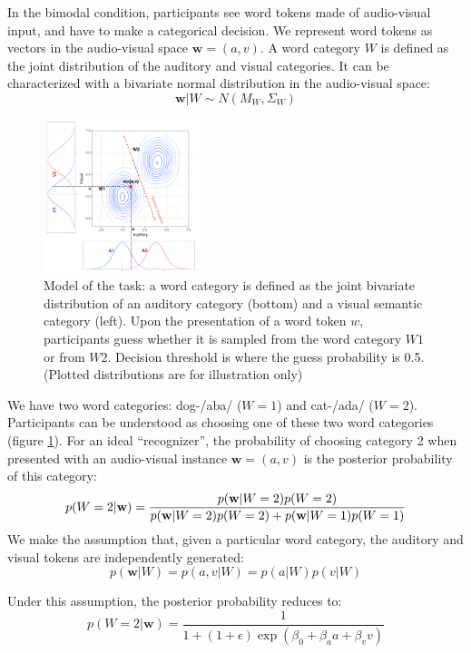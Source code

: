 \documentclass[10pt,letterpaper]{article}
\begin{document}
In the bimodal condition, participants see word tokens made of audio-visual input, and have to make a categorical decision. We represent word tokens as vectors in the audio-visual space $\mathbf{w}=(a,v)$.
A word category $W$ is defined as the joint distribution of the auditory and visual categories. It can be characterized with a bivariate normal distribution in the audio-visual space:
$$ \mathbf{w} | W \sim  N(M_W, \Sigma_W) $$
\begin{figure}[tp]
\centering
\includegraphics[width=0.4\textwidth]{MyTask.png}
\caption{Model of the task: a word category is defined as the joint bivariate distribution of an auditory category (bottom) and a visual semantic category (left). Upon the presentation of a word token $w$, participants guess whether it is sampled from the word category $W1$ or from $W2$. Decision threshold is where the guess probability is 0.5. (Plotted distributions are for illustration only)}
\label{fig:space}
\end{figure}
We have two word categories: dog-/aba/ ($W=1$) and cat-/ada/ ($W=2$). Participants can be understood as choosing one of these two word categories (figure \ref{fig:space}). For an ideal ``recognizer'', the probability of choosing category 2 when presented with an audio-visual instance $\mathbf{w}=(a,v)$ is the posterior probability of this category:
\begin{equation}
\small
p(W=2 | \mathbf{w})=\frac{p(\mathbf{w}|W=2)p(W=2)}{p(\mathbf{w}|W=2)p(W=2)+p(\mathbf{w}|W=1)p(W=1)}
\end{equation}
We make the assumption that, given a particular word category, the auditory and visual tokens are independently generated:
\begin{equation}
p(\mathbf{w} | W) = p(a,v| W) = p(a| W)p(v| W)
\end{equation}

Under this assumption, the posterior probability reduces to:
\begin{equation}
p(W=2 | \mathbf{w})=\frac{1}{1+(1+\epsilon)\exp(\beta_0+\beta_aa+\beta_vv)}
\label{eq:pred}
\end{equation}
\end{document}

